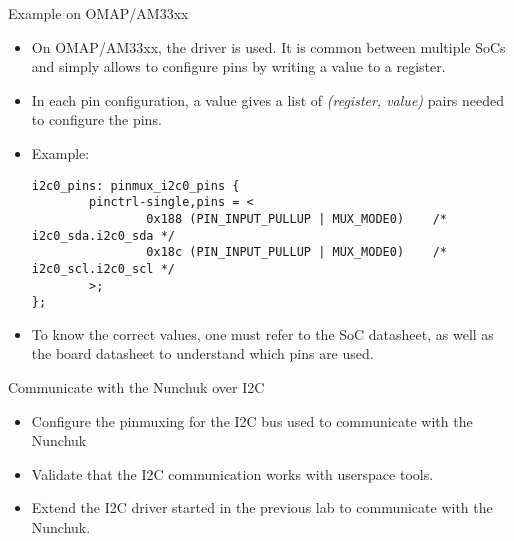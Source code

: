 \begin{frame}[fragile]{Example on OMAP/AM33xx}
  \begin{itemize}
  \item On OMAP/AM33xx, the  driver is used. It
    is common between multiple SoCs and simply allows to configure
    pins by writing a value to a register.
  \item In each pin configuration, a  value
    gives a list of {\em (register, value)} pairs needed to configure
    the pins.
  \item Example:
    \begin{verbatim}
i2c0_pins: pinmux_i2c0_pins {
        pinctrl-single,pins = <
                0x188 (PIN_INPUT_PULLUP | MUX_MODE0)    /* i2c0_sda.i2c0_sda */
                0x18c (PIN_INPUT_PULLUP | MUX_MODE0)    /* i2c0_scl.i2c0_scl */
        >;
};
    \end{verbatim}
  \item To know the correct values, one must refer to the SoC
    datasheet, as well as the board datasheet to understand which pins
    are used.
  \end{itemize}
\end{frame}

\setuplabframe
{Communicate with the Nunchuk over I2C}
{
  \begin{itemize}
  \item Configure the pinmuxing for the I2C bus used to communicate
    with the Nunchuk
  \item Validate that the I2C communication works with userspace
    tools.
  \item Extend the I2C driver started in the previous lab to
    communicate with the Nunchuk.
  \end{itemize}
}
